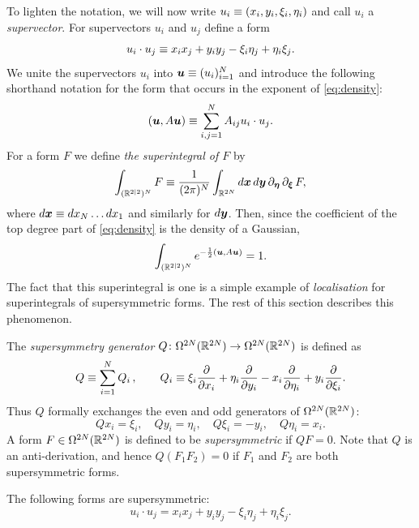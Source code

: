 \documentclass[11pt,a4paper]{article}
\begin{document}
To lighten the notation, we will now write $u_i \equiv (x_i,y_i,\xi_i,\eta_i)$
and call $u_i$ a \emph{supervector}.
For supervectors $u_i$ and $u_j$ define a form
\begin{equation}
  u_i \cdot u_j
  \equiv
  x_ix_j+y_iy_j - \xi_i\eta_j + \eta_i\xi_j.
\end{equation}
We unite the supervectors $u_i$ into $\boldsymbol{u} \equiv (u_i)_{i=1}^N$ and
introduce the following shorthand notation for the form
that occurs in the exponent of \eqref{eq:density}:
\begin{equation}
  \label{eq:ff}
  (\boldsymbol{u}, A\boldsymbol{u}) \equiv \sum_{i,j=1}^{N} A_{ij} u_{i}\cdot u_{j}.
\end{equation}
For a form $F$ we define \emph{the superintegral of $F$} by
\begin{equation}
  \label{eq:R22-int}
  \int_{(\mathbb{R}^{2|2})^{N}}F \equiv \frac{1}{(2\pi)^{N}}
  \int_{\mathbb{R}^{2N}}d\boldsymbol{x} \, d\boldsymbol{y} \, \partial_{\boldsymbol{\eta}}\, \partial_{\boldsymbol{\xi}} \, F,
\end{equation}
where $d\boldsymbol{x} \equiv dx_{N}\dots dx_{1}$ and similarly for
$d\boldsymbol{y}$. Then, since the coefficient of the top degree part of
\eqref{eq:density} is the density of a Gaussian,
\begin{equation}
  \label{eq:loc-baby}
  \int_{(\mathbb{R}^{2|2})^N}e^{-\frac12 (\boldsymbol{u},A\boldsymbol{u})} = 1
  .
\end{equation}
The fact that this superintegral is one is a
simple example of \emph{localisation} for superintegrals of
supersymmetric forms. The rest of this section describes this
phenomenon.

The \emph{supersymmetry generator}
$Q\colon \Omega^{2N}(\mathbb{R}^{2N}) \to \Omega^{2N}(\mathbb{R}^{2N})$ is defined as
\begin{equation}
  Q \equiv \sum_{i=1}^{N} Q_i\,,
  \qquad 
  Q_i \equiv \xi_i \frac{\partial }{\partial x_i} + \eta_i \frac{\partial }{\partial y_i} - x_i\frac{\partial }{\partial \eta_i} + y_i \frac{\partial }{\partial \xi_i}.
\end{equation}
Thus $Q$ formally exchanges the even and odd generators of $\Omega^{2N}(\mathbb{R}^{2N})$:
\begin{equation}
  Qx_i = \xi_i, \quad Qy_i = \eta_i, \quad Q\xi_i = -y_i, \quad Q\eta_i = x_i.
\end{equation}
A form $F\in \Omega^{2N}(\mathbb{R}^{2N})$ is defined to be
\emph{supersymmetric} if $QF=0$.
Note that $Q$ is an anti-derivation, and hence $Q(F_{1}F_{2})=0$ if $F_{1}$ and $F_{2}$
are both supersymmetric forms.

\begin{example}
  \label{ex:udotu}
  The following forms are supersymmetric:
  \begin{equation} 
    \label{e:udotudef}
    u_i \cdot u_j
    = x_ix_j+y_iy_j - \xi_i\eta_j + \eta_i\xi_j.
  \end{equation}
\end{example}
\end{document}
